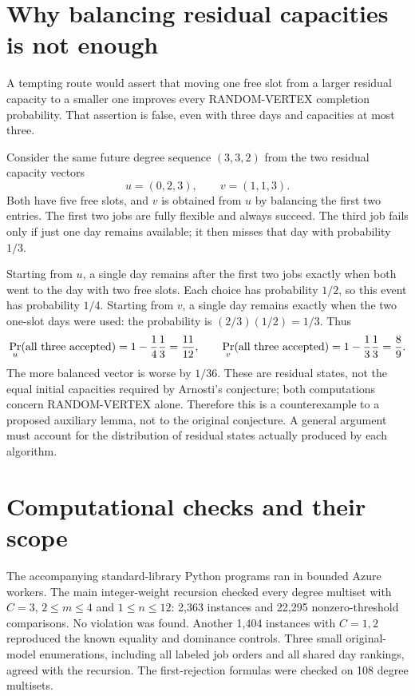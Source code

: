 \documentclass[11pt]{article}
\begin{document}
\section{Why balancing residual capacities is not enough}
A tempting route would assert that moving one free slot from a larger
residual capacity to a smaller one improves every RANDOM-VERTEX
completion probability. That assertion is false, even with three days
and capacities at most three.

Consider the same future degree sequence $(3,3,2)$ from the two residual
capacity vectors
\[
 u=(0,2,3),\qquad v=(1,1,3).
\]
Both have five free slots, and $v$ is obtained from $u$ by balancing
the first two entries. The first two jobs are fully flexible and always
succeed. The third job fails only if just one day remains available;
it then misses that day with probability $1/3$.

Starting from $u$, a single day remains after the first two jobs exactly
when both went to the day with two free slots. Each choice has probability
$1/2$, so this event has probability $1/4$. Starting from $v$, a single
day remains exactly when the two one-slot days were used: the probability
is $(2/3)(1/2)=1/3$. Thus
\[
 \Pr_u(\hbox{all three accepted})=1-\frac14\frac13=\frac{11}{12},
 \qquad
 \Pr_v(\hbox{all three accepted})=1-\frac13\frac13=\frac89.
\]
The more balanced vector is worse by $1/36$.
These are residual states, not the equal initial capacities required by
Arnosti's conjecture; both computations concern RANDOM-VERTEX alone.
Therefore this is a counterexample to a proposed auxiliary lemma, not
to the original conjecture. A general argument must account for the
distribution of residual states actually produced by each algorithm.

\section{Computational checks and their scope}
The accompanying standard-library Python programs ran in bounded Azure
workers. The main integer-weight recursion checked every degree multiset
with $C=3$, $2\leq m\leq4$ and $1\leq n\leq12$: 2,363 instances and
22,295 nonzero-threshold comparisons. No violation was found. Another
1,404 instances with $C=1,2$ reproduced the known equality and dominance
controls. Three small original-model enumerations, including all labeled
job orders and all shared day rankings, agreed with the recursion.
The first-rejection formulas were checked on 108 degree multisets.
\end{document}
